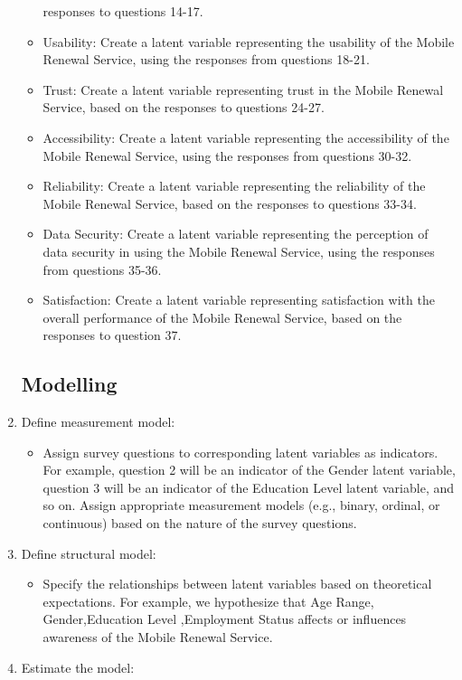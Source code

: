 \documentclass[
]{article}
\providecommand{\tightlist}{%
  \setlength{\itemsep}{0pt}\setlength{\parskip}{0pt}}
\begin{document}
\begin{enumerate}
\begin{itemize}
    responses to questions 14-17.
  \item
    Usability: Create a latent variable representing the usability of
    the Mobile Renewal Service, using the responses from questions
    18-21.
  \item
    Trust: Create a latent variable representing trust in the Mobile
    Renewal Service, based on the responses to questions 24-27.
  \item
    Accessibility: Create a latent variable representing the
    accessibility of the Mobile Renewal Service, using the responses
    from questions 30-32.
  \item
    Reliability: Create a latent variable representing the reliability
    of the Mobile Renewal Service, based on the responses to questions
    33-34.
  \item
    Data Security: Create a latent variable representing the perception
    of data security in using the Mobile Renewal Service, using the
    responses from questions 35-36.
  \item
    Satisfaction: Create a latent variable representing satisfaction
    with the overall performance of the Mobile Renewal Service, based on
    the responses to question 37.
  \end{itemize}

  \hypertarget{modelling}{%
  \subsection{Modelling}\label{modelling}}
\item
  Define measurement model:

  \begin{itemize}
  \tightlist
  \item
    Assign survey questions to corresponding latent variables as
    indicators. For example, question 2 will be an indicator of the
    Gender latent variable, question 3 will be an indicator of the
    Education Level latent variable, and so on. Assign appropriate
    measurement models (e.g., binary, ordinal, or continuous) based on
    the nature of the survey questions.
  \end{itemize}
\item
  Define structural model:

  \begin{itemize}
  \tightlist
  \item
    Specify the relationships between latent variables based on
    theoretical expectations. For example, we hypothesize that Age
    Range, Gender,Education Level ,Employment Status affects or
    influences awareness of the Mobile Renewal Service.
  \end{itemize}
\item
  Estimate the model:


\end{enumerate}
\end{document}
